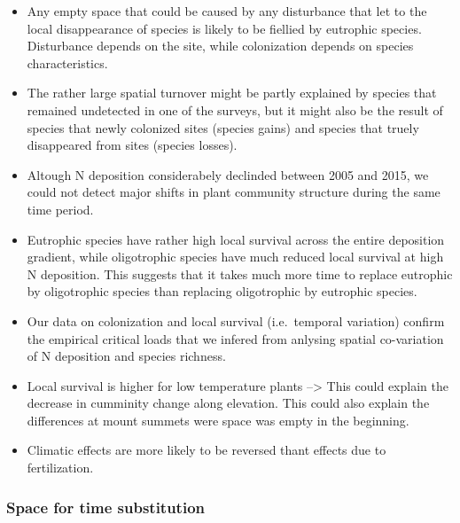 \documentclass[fleqn,10pt,lineno]{wlpeerj} %
\theoremstyle{definition}
\theoremstyle{definition}
\theoremstyle{definition}
\theoremstyle{remark}
\begin{document}
\begin{itemize}
\item
  Any empty space that could be caused by any disturbance that let to
  the local disappearance of species is likely to be fiellied by
  eutrophic species. Disturbance depends on the site, while colonization
  depends on species characteristics.
\item
  The rather large spatial turnover might be partly explained by species
  that remained undetected in one of the surveys, but it might also be
  the result of species that newly colonized sites (species gains) and
  species that truely disappeared from sites (species losses).
\item
  Altough N deposition considerabely declinded between 2005 and 2015, we
  could not detect major shifts in plant community structure during the
  same time period.
\item
  Eutrophic species have rather high local survival across the entire
  deposition gradient, while oligotrophic species have much reduced
  local survival at high N deposition. This suggests that it takes much
  more time to replace eutrophic by oligotrophic species than replacing
  oligotrophic by eutrophic species.
\item
  Our data on colonization and local survival (i.e.~temporal variation)
  confirm the empirical critical loads that we infered from anlysing
  spatial co-variation of N deposition and species richness.
\item
  Local survival is higher for low temperature plants --\textgreater{}
  This could explain the decrease in cumminity change along elevation.
  This could also explain the differences at mount summets were space
  was empty in the beginning.
\item
  Climatic effects are more likely to be reversed thant effects due to
  fertilization.
\end{itemize}

\subsubsection{Space for time
substitution}\label{space-for-time-substitution}
\end{document}
